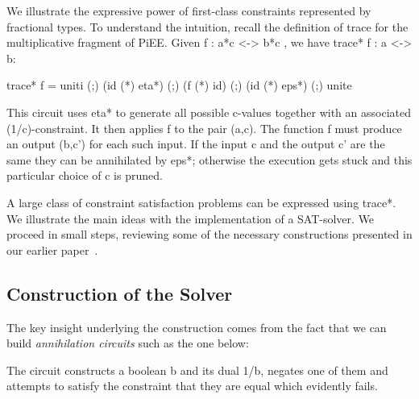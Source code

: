 \documentclass[preprint]{sigplanconf}
\begin{document}
We illustrate the expressive power of first-class constraints represented by
fractional types. To understand the intuition, recall the definition of
{{trace}} for the multiplicative fragment of {{PiEE}}. 
Given {{f : a*c <-> b*c }}, we have {{trace* f : a <-> b}}: 

{{ trace* f = uniti (;) (id (*) eta*) (;) (f (*) id) (;) (id (*) eps*) (;) unite }}

\noindent This circuit uses {{eta*}} to generate all possible {{c}}-values
together with an associated {{(1/c)}}-constraint. It then applies {{f}} to the
pair {{(a,c)}}. The function {{f}} must produce an output {{(b,c')}} for each
such input. If the input {{c}} and the output {{c'}} are the same they can be
annihilated by {{eps*}}; otherwise the execution gets stuck and this
particular choice of {{c}} is pruned. 


A large class of constraint satisfaction problems can be expressed
using {{trace*}}. We illustrate the main ideas with the implementation
of a SAT-solver.  We proceed in small steps, reviewing some of the
necessary constructions presented in our earlier
paper~\cite{infeffects}.

\subsection{Construction of the Solver}

The key insight underlying the construction comes from the fact that we can
build \emph{annihilation circuits} such as the one below:

\begin{center}
\end{center}
The circuit constructs a boolean {{b}} and its dual {{1/b}}, negates one of
them and attempts to satisfy the constraint that they are equal which
evidently fails. 
\end{document}
